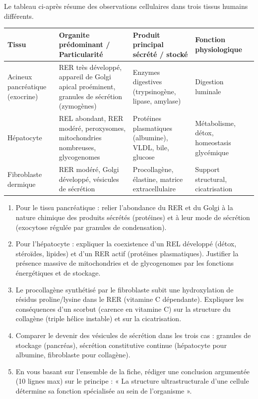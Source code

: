\documentclass[11pt]{article}
\begin{document}
\begin{exercice}
Le tableau ci-après résume des observations cellulaires dans trois tissus humains différents.

\begin{tabularx}{\linewidth}{@{}lXXX@{}}
\toprule
\textbf{Tissu} & \textbf{Organite prédominant / Particularité} & \textbf{Produit principal sécrété / stocké} & \textbf{Fonction physiologique} \\
\midrule
Acineux pancréatique (exocrine) & RER très développé, appareil de Golgi apical proéminent, granules de sécrétion (zymogènes) & Enzymes digestives (trypsinogène, lipase, amylase) & Digestion luminale \\
Hépatocyte & REL abondant, RER modéré, peroxysomes, mitochondries nombreuses, glycogenomes & Protéines plasmatiques (albumine), VLDL, bile, glucose & Métabolisme, détox, homeostasis glycémique \\
Fibroblaste dermique & RER modéré, Golgi développé, vésicules de sécrétion & Procollagène, élastine, matrice extracellulaire & Support structural, cicatrisation \\
\bottomrule
\end{tabularx}

\begin{enumerate}
\item Pour le tissu pancréatique : relier l'abondance du RER et du Golgi à la nature chimique des produits sécrétés (protéines) et à leur mode de sécrétion (exocytose régulée par granules de condensation).
\item Pour l'hépatocyte : expliquer la coexistence d'un REL développé (détox, stéroïdes, lipides) et d'un RER actif (protéines plasmatiques). Justifier la présence massive de mitochondries et de glycogenomes par les fonctions énergétiques et de stockage.
\item Le procollagène synthétisé par le fibroblaste subit une hydroxylation de résidus proline/lysine dans le RER (vitamine C dépendante). Expliquer les conséquences d'un scorbut (carence en vitamine C) sur la structure du collagène (triple hélice instable) et sur la cicatrisation.
\item Comparer le devenir des vésicules de sécrétion dans les trois cas : granules de stockage (pancréas), sécrétion constitutive continue (hépatocyte pour albumine, fibroblaste pour collagène).
\item En vous basant sur l'ensemble de la fiche, rédiger une conclusion argumentée (10 lignes max) sur le principe : « La structure ultrastructurale d'une cellule détermine sa fonction spécialisée au sein de l'organisme ».
\end{enumerate}
\end{exercice}
\end{document}
